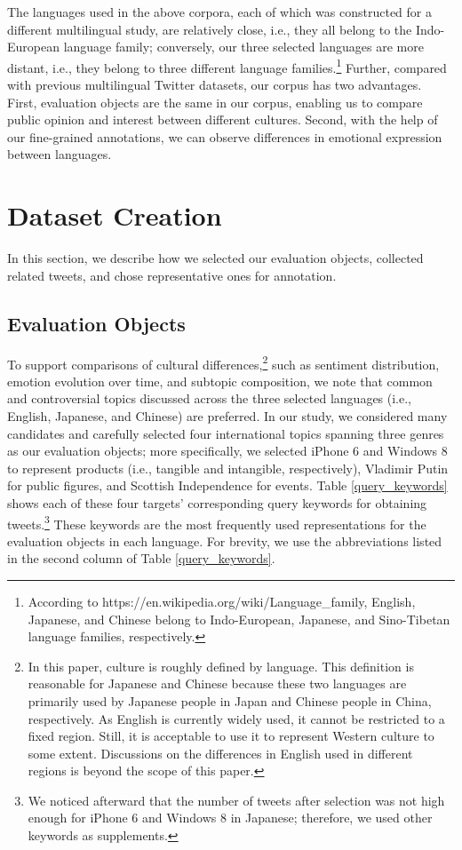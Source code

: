 \documentclass[english]{jnlp_1.4}
\begin{document}
The languages used in the above corpora, each of which was constructed for a different multilingual study, are relatively close, i.e., they all belong to the Indo-European language family; conversely, our three selected languages are more distant, i.e., they belong to three different language families.\footnote{According to https://en.wikipedia.org/wiki/Language\_family, English, Japanese, and Chinese belong to Indo-European, Japanese, and Sino-Tibetan language families, respectively.} Further, compared with previous multilingual Twitter datasets, our corpus has two advantages. First, evaluation objects are the same in our corpus, enabling us to compare public opinion and interest between different cultures. Second, with the help of our fine-grained annotations, we can observe differences in emotional expression between languages.


\section{Dataset Creation}

In this section, we describe how we selected our evaluation objects, collected related tweets, and chose representative ones for annotation.


\subsection{Evaluation Objects}

To support comparisons of cultural differences,\footnote{In this paper, culture is roughly defined by language. This definition is reasonable for Japanese and Chinese because these two languages are primarily used by Japanese people in Japan and Chinese people in China, respectively. As English is currently widely used, it cannot be restricted to a fixed region. Still, it is acceptable to use it to represent Western culture to some extent. Discussions on the differences in English used in different regions is beyond the scope of this paper.} such as sentiment distribution, emotion evolution over time, and subtopic composition, we note that common and controversial topics discussed across the three selected languages (i.e., English, Japanese, and Chinese) are preferred. In our study, we considered many candidates and carefully selected four international topics spanning three genres as our evaluation objects; more specifically, we selected iPhone 6 and Windows 8 to represent products (i.e., tangible and intangible, respectively), Vladimir Putin for public figures, and Scottish Independence for events. Table \ref{query_keywords} shows each of these four targets' corresponding query keywords for obtaining tweets.\footnote{We noticed afterward that the number of tweets after selection was not high enough for iPhone 6 and Windows 8 in Japanese; therefore, we used other keywords as supplements.} These keywords are the most frequently used representations for the evaluation objects in each language. For brevity, we use the abbreviations listed in the second column of Table \ref{query_keywords}.
\end{document}
